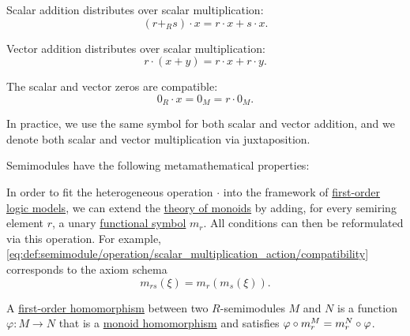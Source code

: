 \begin{definition}
\begin{thmenum}[series=def:semimodule]
\begin{thmenum}
       Scalar addition distributes over scalar multiplication:
      \begin{equation}\label{eq:def:semimodule/operation/scalar_addition_distributivity}
        (r +_R s) \cdot x = r \cdot x + s \cdot x.
      \end{equation}

       Vector addition distributes over scalar multiplication:
      \begin{equation}\label{eq:def:semimodule/operation/vector_addition_distributivity}
        r \cdot (x + y) = r \cdot x + r \cdot y.
      \end{equation}

       The scalar and vector zeros are compatible:
      \begin{equation}\label{eq:def:semimodule/operation/absorption}
        0_R \cdot x = 0_M = r \cdot 0_M.
      \end{equation}
    \end{thmenum}

    In practice, we use the same symbol for both scalar and vector addition, and we denote both scalar and vector multiplication via juxtaposition.
  \end{thmenum}

  Semimodules have the following metamathematical properties:
  \begin{thmenum}[resume=def:semimodule]
     In order to fit the heterogeneous operation \( \cdot \) into the framework of \hyperref[def:first_order_semantics/satisfiability]{first-order logic models}, we can extend the \hyperref[def:monoid/theory]{theory of monoids} by adding, for every semiring element \( r \), a unary \hyperref[def:first_order_language/func]{functional symbol} \( m_r \). All conditions can then be reformulated via this operation. For example, \eqref{eq:def:semimodule/operation/scalar_multiplication_action/compatibility} corresponds to the axiom schema
    \begin{equation*}
      m_{rs}(\xi) = m_r(m_s(\xi)).
    \end{equation*}

     A \hyperref[def:first_order_homomorphism]{first-order homomorphism} between two \( R \)-semimodules \( M \) and \( N \) is a function \( \varphi: M \to N \) that is a \hyperref[def:monoid/homomorphism]{monoid homomorphism} and satisfies \( \varphi \bincirc m_r^M = m_r^N \bincirc \varphi \).


\end{thmenum}
\end{definition}
